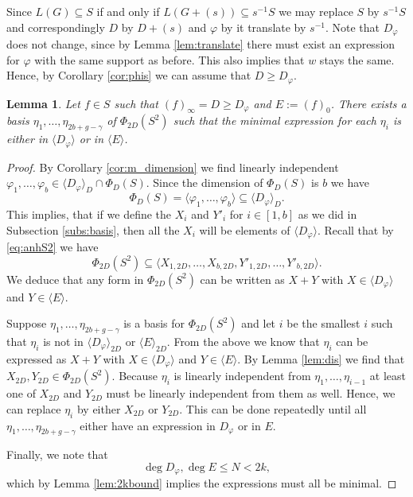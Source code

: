 \documentclass[12pt]{amsart}
\renewcommand{\leq}{\leqslant}
\renewcommand{\geq}{\geqslant}
\newtheorem{lemma}[theorem]{Lemma}
\theoremstyle{definition}
\newcommand{\divi}[1]{\langle #1 \rangle}
\begin{document}
	Since $L(G)\subseteq S$ if and only if $L(G + (s)) \subseteq s^{-1}S$ we may replace $S$ by $s^{-1}S$ and correspondingly $D$ by $D + (s)$ and $\varphi$ by it translate by $s^{-1}$. Note that $D_\varphi$ does not change, since by Lemma \ref{lem:translate} there must exist an expression for $\varphi$ with the same support as before. This also implies that $w$ stays the same. Hence, by Corollary \ref{cor:phis} we can assume that $D \geq D_\varphi$.
	
	\begin{lemma} \label{lem:disj}
		Let $f \in S$ such that $(f)_\infty = D \geq D_\varphi$ and $E := (f)_0$. There exists a basis $\eta_1,\ldots, \eta_{2b + g - \gamma}$ of $\Phi_{2D}(S^2)$ such that the minimal expression for each $\eta_i$ is either in $\divi {D_\varphi}$ or in $\divi E$. 
	\end{lemma}
	\begin{proof}
		By Corollary \ref{cor:m_dimension} we find linearly independent $\varphi_1, \ldots, \varphi_b \in \divi {D_\varphi}_D \cap \Phi_{D}(S)$. Since the dimension of $\Phi_D(S)$ is $b$ we have 
		$$\Phi_D(S) = \langle \varphi_1, \ldots, \varphi_b \rangle \subseteq \divi {D_\varphi}_D.$$ 
		This implies, that if we define the $X_i$ and $Y'_i$ for $i \in [1, b]$ as we did in Subsection \ref{subs:basis}, then all the $X_i$ will be elements of $\divi {D_\varphi}$. Recall that by \eqref{eq:anhS2} we have
		$$\Phi_{2D}(S^2) \subseteq \langle X_{1, 2D}, \ldots, X_{b, 2D}, Y'_{1, 2D}, \ldots, Y'_{b, 2D} \rangle.$$ 
		We deduce that any form in $\Phi_{2D}(S^2)$ can be written as $X + Y$ with $X \in \divi {D_\varphi}$ and $Y \in \divi E$. 
		
		Suppose $\eta_1, \ldots, \eta_{2b + g - \gamma}$ is a basis for $\Phi_{2D}(S^2)$ and let $i$ be the smallest $i$ such that $\eta_i$ is not in $\divi {D_\varphi}_{2D}$ or $\divi E_{2D}$. From the above we know that $\eta_i$ can be expressed as $X + Y$ with $X \in\divi {D_{\varphi}}$ and $Y \in \divi E$. By Lemma \ref{lem:dis} we find that $X_{2D}, Y_{2D} \in \Phi_{2D}(S^2)$. Because $\eta_i$ is linearly independent from $\eta_1, \ldots, \eta_{i-1}$ at least one of $X_{2D}$ and $Y_{2D}$ must be linearly independent from them as well. Hence, we can replace $\eta_i$ by either $X_{2D}$ or $Y_{2D}$. This can be done repeatedly until all $\eta_1, \ldots, \eta_{2b + g - \gamma}$ either have an expression in $D_\varphi$ or in $E$.
		
		Finally, we note that $$\deg D_\varphi, \deg E \leq N < 2k,$$
		which by Lemma \ref{lem:2kbound} implies the expressions must all be minimal. 
	\end{proof}
	
\end{document}
